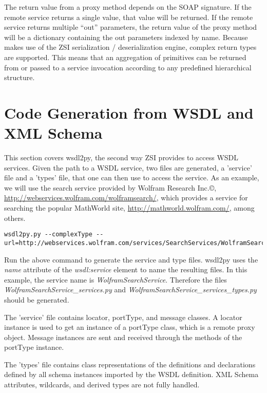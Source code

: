 The return value from a proxy method depends on the SOAP signature. If the 
remote service returns a single value, that value will be returned. If the 
remote service returns multiple ``out'' parameters, the return value of the 
proxy method will be a dictionary containing the out parameters indexed by 
name.  Because  makes use of the ZSI serialization / 
deserialization engine, complex return types are supported.  This means 
that an aggregation of primitives can be returned from or passed to a service
invocation according to any predefined hierarchical structure.


\section{Code Generation from WSDL and XML Schema}

This section covers wsdl2py, the second way ZSI provides to access WSDL
services.  Given the path to a WSDL service, two files are generated, a 
'service' file and a 'types' file, that one can then use to access the
service.  As an example, we will use the search service provided by Wolfram
Research Inc.\copyright{}, \url{http://webservices.wolfram.com/wolframsearch/}, 
which provides a service for searching the popular MathWorld site, 
\url{http://mathworld.wolfram.com/}, among others.

\begin{verbatim}
wsdl2py.py --complexType --url=http://webservices.wolfram.com/services/SearchServices/WolframSearch2.wsdl
\end{verbatim}

Run the above command to generate the service and type files.  wsdl2py uses
the {\it name} attribute of the {\it wsdl:service} element to name the resulting files.
In this example, the service name is {\it WolframSearchService}.  Therefore the files
{\it WolframSearchService_services.py} and {\it WolframSearchService_services_types.py}
should be generated.

The 'service' file contains locator, portType, and message classes.  
A locator instance is used to get an instance of a portType class, 
which is a remote proxy object. Message instances are sent and received 
through the methods of the portType instance.

The 'types' file contains class representations of the definitions and
declarations defined by all schema instances imported by the WSDL definition.
XML Schema attributes, wildcards, and derived types are not fully
handled.

